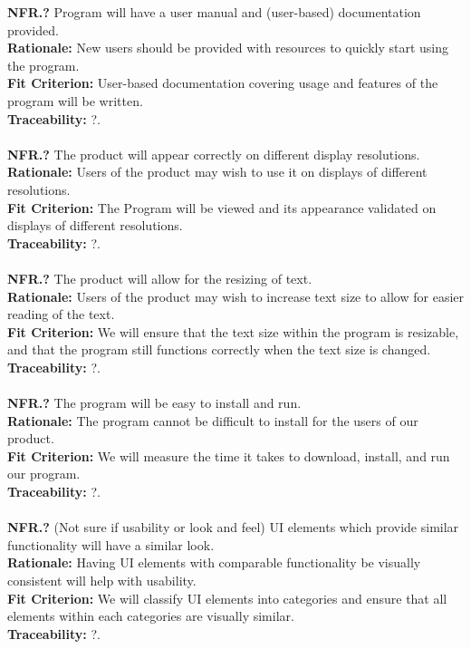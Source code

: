 \documentclass[12pt]{article}
\begin{document}
  \textbf{NFR.?} Program will have a user manual and (user-based) documentation provided.\\
  \textbf{Rationale:} New users should be provided with resources to quickly start using the program.\\
  \textbf{Fit Criterion:} User-based documentation covering usage and features of the program will be written.\\
  \textbf{Traceability:} ?.\\\\

  \textbf{NFR.?} The product will appear correctly on different display resolutions.\\
  \textbf{Rationale:} Users of the product may wish to use it on displays of different resolutions.\\
  \textbf{Fit Criterion:} The Program will be viewed and its appearance validated on displays of different resolutions.\\
  \textbf{Traceability:} ?.\\\\

  \textbf{NFR.?} The product will allow for the resizing of text.\\
  \textbf{Rationale:} Users of the product may wish to increase text size to allow for easier reading of the text.\\
  \textbf{Fit Criterion:} We will ensure that the text size within the program is resizable, and that the program still functions correctly when the text size is changed.\\
  \textbf{Traceability:} ?.\\\\

  \textbf{NFR.?} The program will be easy to install and run.\\
  \textbf{Rationale:} The program cannot be difficult to install for the users of our product.\\
  \textbf{Fit Criterion:} We will measure the time it takes to download, install, and run our program.\\
  \textbf{Traceability:} ?.\\\\

  \textbf{NFR.?} (Not sure if usability or look and feel) UI elements which provide similar functionality will have a similar look.\\
  \textbf{Rationale:} Having UI elements with comparable functionality be visually consistent will help with usability.\\
  \textbf{Fit Criterion:} We will classify UI elements into categories and ensure that all elements within each categories are visually similar.\\
  \textbf{Traceability:} ?.\\\\
\end{document}
